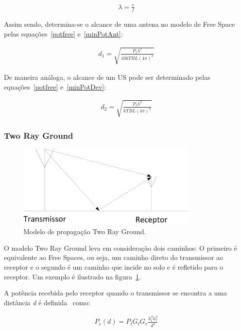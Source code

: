\begin{align}
  \label{lambda}\lambda=\frac{c}{f}
\end{align}

Assim sendo, determina-se o alcance de uma antena no modelo de Free Space pelas equações~\ref{potfree} e~\ref{minPotAnt}:

\begin{align}
  \label{dFreeAnt} d_1 = \sqrt{\frac{P_t\lambda^{2}}{10kTBL(4\pi)^{2}}}
\end{align}

De maneira análoga, o alcance de um US pode ser determinado pelas equações~\ref{potfree} e~\ref{minPotDev}:

\begin{align}
  \label{dFreeDev} d_2 = \sqrt{\frac{P_t\lambda^{2}}{kTBL(4\pi)^{2}}}
\end{align}

\subsubsection{Two Ray Ground}

\begin{figure}[htb]
\centering
\includegraphics[width=0.8\textwidth]{figs/tworay}
\caption[Modelo de propagação Two Ray Ground.]
{Modelo de propagação Two Ray Ground.}
\label{fig:tworay}
\end{figure}

O modelo Two Ray Ground leva em consideração dois caminhos: O primeiro é equivalente ao Free Spaces, ou seja, um caminho direto do transmissor ao receptor e o segundo é um caminho que incide no solo e é refletido para o receptor. Um exemplo é ilustrado na figura~\ref{fig:tworay}.

A potência recebida pelo receptor quando o transmissor se encontra a uma distância \textit{d} é definida~\cite{rapapport} como: 

\begin{align}
  \label{pottworay} P_r(d) = P_tG_tG_r\frac{h_t^{2}h_r^{2}}{d^4}
\end{align}

